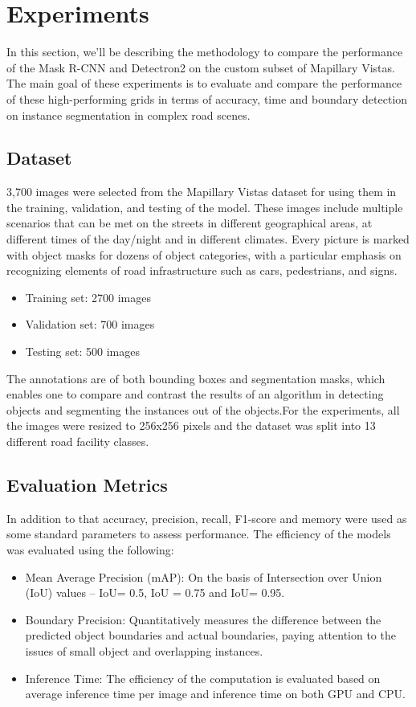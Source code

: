 \documentclass[conference]{IEEEtran}
\begin{document}
\section{Experiments}
In this section, we'll be describing the methodology to compare the performance of the Mask R-CNN and Detectron2 on the custom subset of Mapillary Vistas. The main goal of these experiments is to evaluate and compare the performance of these high-performing grids in terms of accuracy, time and boundary detection on instance segmentation in complex road scenes.
\subsection{Dataset}
3,700 images were selected from the Mapillary Vistas dataset for using them in the training, validation, and testing of the model. These images include multiple scenarios that can be met on the streets in different geographical areas, at different times of the day/night and in different climates. Every picture is marked with object masks for dozens of object categories, with a particular emphasis on recognizing elements of road infrastructure such as cars, pedestrians, and signs.
\begin{itemize}
    \item Training set: 2700 images
    \item Validation set: 700 images
    \item Testing set: 500 images
\end{itemize}
The annotations are of both bounding boxes and segmentation masks, which enables one to compare and contrast the results of an algorithm in detecting objects and segmenting the instances out of the objects.For the experiments, all the images were resized to 256x256 pixels and the dataset was split into 13 different road facility classes.

\subsection{Evaluation Metrics}
In addition to that accuracy, precision, recall, F1-score and memory were used as some standard parameters to assess performance. The efficiency of the models was evaluated using the following:
\begin{itemize}
    \item Mean Average Precision (mAP): On the basis of Intersection over Union (IoU) values – IoU= 0.5, IoU = 0.75 and IoU= 0.95.
    \item Boundary Precision: Quantitatively measures the difference between the predicted object boundaries and actual boundaries, paying attention to the issues of small object and overlapping instances.
    \item Inference Time: The efficiency of the computation is evaluated based on average inference time per image and inference time on both GPU and CPU.
\end{itemize}
\end{document}
